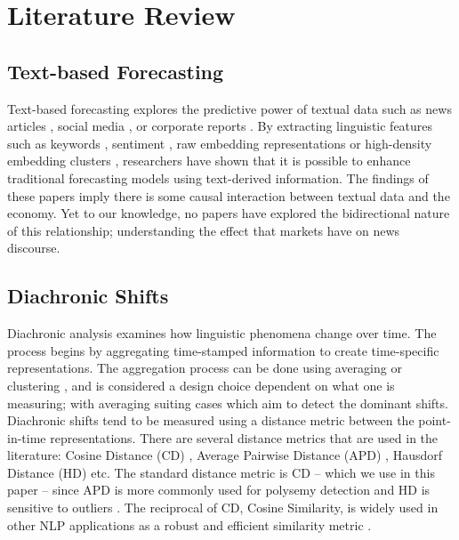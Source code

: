 \section{Literature Review}
\vspace{-0.1cm}

\subsection{Text-based Forecasting}

Text-based forecasting explores the predictive power of textual data such as news articles \cite{peng-jiang-2016-leverage, 10.1145/3533018, wang2024newsforecast, rahimikia2024r}, social media \cite{10.1145/2542182.2542190, iso-etal-2016-forecasting}, or corporate reports \cite{kogan-etal-2009-predicting}. By extracting linguistic features such as keywords \cite{iso-etal-2016-forecasting}, sentiment \cite{math10132156}, raw embedding representations \cite{sawhney-etal-2020-deep} or high-density embedding clusters \cite{drinkall-etal-2025-forecasting, drinkall2025financialregression}, researchers have shown that it is possible to enhance traditional forecasting models using text-derived information. The findings of these papers imply there is some causal interaction between textual data and the economy. Yet to our knowledge, no papers have explored the bidirectional nature of this relationship; understanding the effect that markets have on news discourse. 
\vspace{-0.1cm}

\subsection{Diachronic Shifts}
\label{sec:diachronic}

Diachronic analysis \cite{10.1145/3672393} examines how linguistic phenomena change over time. The process begins by aggregating time-stamped information to create time-specific representations. The aggregation process can be done using averaging \cite{10.1007/978-3-030-72610-2_13} or clustering \cite{10.1145/3366424.3382186}, and is considered a design choice dependent on what one is measuring; with averaging suiting cases which aim to detect the dominant shifts. Diachronic shifts tend to be measured using a distance metric between the point-in-time representations. There are several distance metrics that are used in the literature: Cosine Distance (CD) \cite{martinc-etal-2020-leveraging, horn-2021-exploring}, Average Pairwise Distance (APD) \cite{giulianelli-etal-2020-analysing, kudisov-arefyev-2022-black}, Hausdorf Distance (HD) \cite{Wang2020} etc. The standard distance metric is CD -- which we use in this paper -- since APD is more commonly used for polysemy detection \cite{keidar-etal-2022-slangvolution} and HD is sensitive to outliers \cite{Wang2020}. The reciprocal of CD, Cosine Similarity, is widely used in other NLP applications as a robust and efficient similarity metric \cite{thongtan-phienthrakul-2019-sentiment, reimers-gurevych-2019-sentence, yamagiwa-etal-2025-revisiting}. 
\vspace{-0.1cm}

